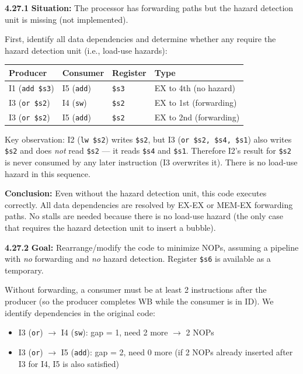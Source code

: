 \medskip\noindent\textbf{4.27.1}
\textbf{Situation:} The processor has forwarding paths but the hazard detection
unit is missing (not implemented).

First, identify all data dependencies and determine whether any require the
hazard detection unit (i.e., load-use hazards):

\begin{center}
\begin{tabular}{llll}
\toprule
\textbf{Producer} & \textbf{Consumer} & \textbf{Register} & \textbf{Type} \\
\midrule
I1 (\texttt{add \$s3}) & I5 (\texttt{add}) & \texttt{\$s3} &
  EX to 4th (no hazard) \\
I3 (\texttt{or \$s2})  & I4 (\texttt{sw})  & \texttt{\$s2} &
  EX to 1st (forwarding) \\
I3 (\texttt{or \$s2})  & I5 (\texttt{add}) & \texttt{\$s2} &
  EX to 2nd (forwarding) \\
\bottomrule
\end{tabular}
\end{center}

Key observation: I2 (\texttt{lw \$s2}) writes \texttt{\$s2}, but I3
(\texttt{or \$s2, \$s4, \$s1}) also writes \texttt{\$s2} and does \emph{not}
read \texttt{\$s2} --- it reads \texttt{\$s4} and \texttt{\$s1}. Therefore I2's
result for \texttt{\$s2} is never consumed by any later instruction (I3
overwrites it). There is no load-use hazard in this sequence.

\textbf{Conclusion:} Even without the hazard detection unit, this code executes
correctly. All data dependencies are resolved by EX-EX or MEM-EX forwarding
paths. No stalls are needed because there is no load-use hazard (the only
case that requires the hazard detection unit to insert a bubble).

\medskip\noindent\textbf{4.27.2}
\textbf{Goal:} Rearrange/modify the code to minimize NOPs, assuming a pipeline
with \emph{no} forwarding and \emph{no} hazard detection. Register
\texttt{\$s6} is available as a temporary.

Without forwarding, a consumer must be at least 2 instructions after the
producer (so the producer completes WB while the consumer is in ID). We
identify dependencies in the original code:

\begin{itemize}
  \item I3 (\texttt{or}) $\to$ I4 (\texttt{sw}): gap = 1, need 2 more $\to$ 2 NOPs
  \item I3 (\texttt{or}) $\to$ I5 (\texttt{add}): gap = 2, need 0 more (if 2 NOPs
    already inserted after I3 for I4, I5 is also satisfied)
\end{itemize}

